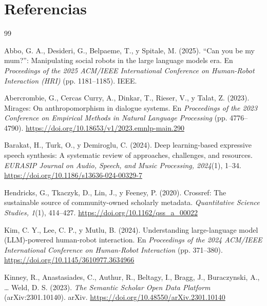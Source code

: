 \documentclass[runningheads]{llncs}
\begin{document}
\section*{Referencias}
\begingroup
\renewcommand{\section}[2]{}
\begin{thebibliography}{99}
\small

 Abbo, G. A., Desideri, G., Belpaeme, T., y Spitale, M. (2025). ``Can you be my mum?'': Manipulating social robots in the large language models era. En \textit{Proceedings of the 2025 ACM/IEEE International Conference on Human-Robot Interaction (HRI)} (pp. 1181--1185). IEEE.

 Abercrombie, G., Cercas Curry, A., Dinkar, T., Rieser, V., y Talat, Z. (2023). Mirages: On anthropomorphism in dialogue systems. En \textit{Proceedings of the 2023 Conference on Empirical Methods in Natural Language Processing} (pp. 4776--4790). \url{https://doi.org/10.18653/v1/2023.emnlp-main.290}

 Barakat, H., Turk, O., y Demiroglu, C. (2024). Deep learning-based expressive speech synthesis: A systematic review of approaches, challenges, and resources. \textit{EURASIP Journal on Audio, Speech, and Music Processing, 2024}(1), 1--34. \url{https://doi.org/10.1186/s13636-024-00329-7}

 Hendricks, G., Tkaczyk, D., Lin, J., y Feeney, P. (2020). Crossref: The sustainable source of community-owned scholarly metadata. \textit{Quantitative Science Studies, 1}(1), 414--427. \url{https://doi.org/10.1162/qss_a_00022}

 Kim, C. Y., Lee, C. P., y Mutlu, B. (2024). Understanding large-language model (LLM)-powered human-robot interaction. En \textit{Proceedings of the 2024 ACM/IEEE International Conference on Human-Robot Interaction} (pp. 371--380). \url{https://doi.org/10.1145/3610977.3634966}

 Kinney, R., Anastasiades, C., Authur, R., Beltagy, I., Bragg, J., Buraczynski, A., \ldots{} Weld, D. S. (2023). \textit{The Semantic Scholar Open Data Platform} (arXiv:2301.10140). arXiv. \url{https://doi.org/10.48550/arXiv.2301.10140}


\end{thebibliography}
\end{document}
